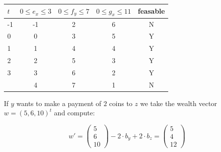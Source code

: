\documentclass[10pt,twocolumn]{article}
\begin{document}
\begin{table}[]
\begin{tabular}{|l|c|c|c|c|}
\hline
$t$                                                & $0\leq e_x\leq 3$   & $0\leq f_y\leq 7$   & $0\leq g_x\leq 11$   & \textbf{feasable}        \\ \hline
\rowcolor[HTML]{34FF34} 
\cellcolor[HTML]{FE0000}-1                       & \cellcolor[HTML]{FE0000}-1  & 2                        & 6                        & \cellcolor[HTML]{FE0000}N \\ \hline
\rowcolor[HTML]{34FF34} 
{\color[HTML]{000000} 0}                         & {\color[HTML]{000000} 0}    & {\color[HTML]{000000} 3} & {\color[HTML]{000000} 5} & {\color[HTML]{000000} Y}  \\ \hline
\rowcolor[HTML]{34FF34} 
1                                                & 1                           & 4                        & 4                        & Y                         \\ \hline
\rowcolor[HTML]{34FF34} 
2                                                & 2                           & 5                        & 3                        & Y                         \\ \hline
\rowcolor[HTML]{34FF34} 
3                                                & 3                           & 6                        & 2                        & Y                         \\ \hline
\rowcolor[HTML]{34FF34} 
\cellcolor[HTML]{FE0000}{\color[HTML]{000000} 4} &  \cellcolor[HTML]{FE0000}4  & 7                        & 1                        & \cellcolor[HTML]{FE0000}N \\ \hline
\end{tabular}
\end{table}


If $y$ wants to make a payment of $2$ coins to $z$ we take the wealth vector $w=(5,6,10)^t$ and compute:

\[w'=\begin{pmatrix}5\\6\\10\end{pmatrix}-2\cdot b_y + 2\cdot b_z = \begin{pmatrix}5\\4\\12\end{pmatrix}\]
\end{document}
